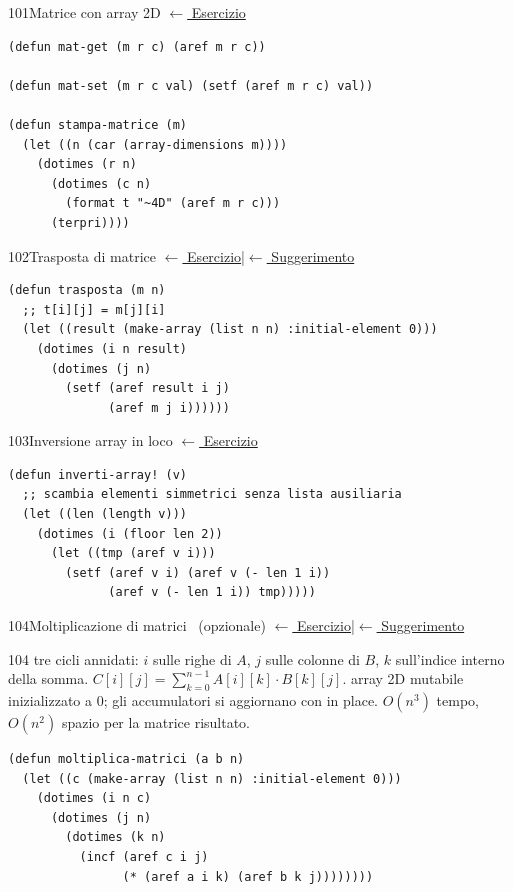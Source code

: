 \label{sol:101}
\begin{solbox}{101}{Matrice con array 2D}
\small\color{black!55}\hyperref[ex:101]{$\leftarrow$ Esercizio}\normalsize\color{black}
\begin{lstlisting}
(defun mat-get (m r c) (aref m r c))

(defun mat-set (m r c val) (setf (aref m r c) val))

(defun stampa-matrice (m)
  (let ((n (car (array-dimensions m))))
    (dotimes (r n)
      (dotimes (c n)
        (format t "~4D" (aref m r c)))
      (terpri))))
\end{lstlisting}
\end{solbox}

\label{sol:102}
\begin{solbox}{102}{Trasposta di matrice}
\small\color{black!55}\hyperref[ex:102]{$\leftarrow$ Esercizio}\enspace\textcolor{black!30}{|}\enspace\hyperref[hint:102]{$\leftarrow$ Suggerimento}\normalsize\color{black}
\begin{lstlisting}
(defun trasposta (m n)
  ;; t[i][j] = m[j][i]
  (let ((result (make-array (list n n) :initial-element 0)))
    (dotimes (i n result)
      (dotimes (j n)
        (setf (aref result i j)
              (aref m j i))))))
\end{lstlisting}
\end{solbox}

\label{sol:103}
\begin{solbox}{103}{Inversione array in loco}
\small\color{black!55}\hyperref[ex:103]{$\leftarrow$ Esercizio}\normalsize\color{black}
\begin{lstlisting}
(defun inverti-array! (v)
  ;; scambia elementi simmetrici senza lista ausiliaria
  (let ((len (length v)))
    (dotimes (i (floor len 2))
      (let ((tmp (aref v i)))
        (setf (aref v i) (aref v (- len 1 i))
              (aref v (- len 1 i)) tmp)))))
\end{lstlisting}
\end{solbox}

\label{sol:104}
\begin{solbox}{104}{Moltiplicazione di matrici \quattroStelle\ (opzionale)}
\small\color{black!55}\hyperref[ex:104]{$\leftarrow$ Esercizio}\enspace\textcolor{black!30}{|}\enspace\hyperref[hint:104]{$\leftarrow$ Suggerimento}\normalsize\color{black}
\begin{ragionamentoBox}{104}
 tre cicli annidati: $i$ sulle righe di $A$, $j$ sulle colonne
di $B$, $k$ sull'indice interno della somma.
 $C[i][j] = \sum_{k=0}^{n-1} A[i][k] \cdot B[k][j]$.
 array 2D mutabile inizializzato a 0;
gli accumulatori si aggiornano con  in place.
 $O(n^3)$ tempo, $O(n^2)$ spazio per la matrice risultato.
\end{ragionamentoBox}
\begin{lstlisting}
(defun moltiplica-matrici (a b n)
  (let ((c (make-array (list n n) :initial-element 0)))
    (dotimes (i n c)
      (dotimes (j n)
        (dotimes (k n)
          (incf (aref c i j)
                (* (aref a i k) (aref b k j))))))))
\end{lstlisting}
\end{solbox}

